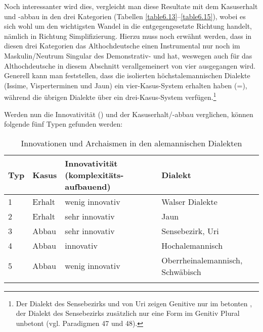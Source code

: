 Noch interessanter wird dies, vergleicht man diese Resultate mit dem Kasuserhalt und -abbau in den drei Kategorien (Tabellen \ref{table6.13}–\ref{table6.15}), wobei es sich wohl um den wichtigsten Wandel in die entgegengesetzte Richtung handelt, nämlich in Richtung Simplifizierung. Hierzu muss noch erwähnt werden, dass in diesen drei Kategorien das Althochdeutsche einen Instrumental nur noch im Maskulin/Neutrum Singular des Demonstrativ- und  hat, weswegen auch für das Althochdeutsche in diesem Abschnitt verallgemeinert von vier  ausgegangen wird. Generell kann man feststellen, dass die isolierten höchstalemannischen Dialekte (Issime, Visperterminen und Jaun) ein vier-Kasus-System erhalten haben (=), während die übrigen Dialekte über ein drei-Kasus-System verfügen.\footnote{Der Dialekt des Sensebezirks und von Uri zeigen Genitive nur im betonten , der Dialekt des Sensebezirks zusätzlich nur eine Form im Genitiv Plural unbetont (vgl. Paradigmen 47 und 48).}

Werden nun die Innovativität () und der Kasuserhalt/-abbau verglichen, können folgende fünf Typen gefunden werden:


\begin{table}
\caption{Innovationen und Archaismen in den alemannischen Dialekten}\label{table6.12}
\begin{tabular}{llll}
\lsptoprule
{Typ} & {Kasus} & \multicolumn{1}{p{2.75cm}}{{Innovativität (komplexitäts-aufbauend)}} & {Dialekt}\\
\midrule
1 & Erhalt & wenig innovativ & Walser Dialekte\\
2 & Erhalt & sehr innovativ & Jaun\\
3 & Abbau & sehr innovativ & Sensebezirk, Uri\\
4 & Abbau & innovativ & Hochalemannisch\\
5 & Abbau & wenig innovativ & Oberrheinalemannisch, Schwäbisch\\
\lspbottomrule
\end{tabular}
\end{table}

